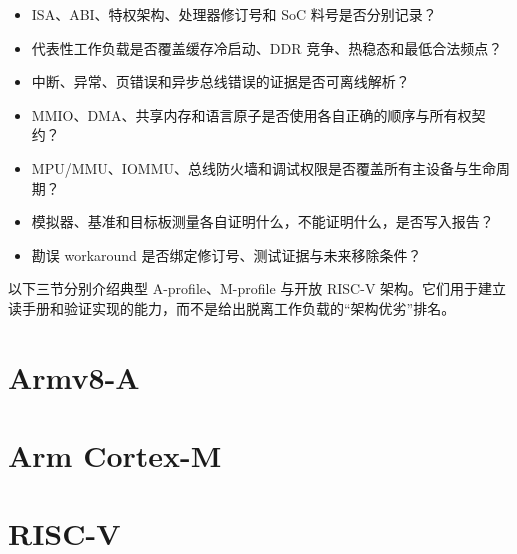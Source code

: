 \begin{itemize}
  \item ISA、ABI、特权架构、处理器修订号和 SoC 料号是否分别记录？
  \item 代表性工作负载是否覆盖缓存冷启动、DDR 竞争、热稳态和最低合法频点？
  \item 中断、异常、页错误和异步总线错误的证据是否可离线解析？
  \item MMIO、DMA、共享内存和语言原子是否使用各自正确的顺序与所有权契约？
  \item MPU/MMU、IOMMU、总线防火墙和调试权限是否覆盖所有主设备与生命周期？
  \item 模拟器、基准和目标板测量各自证明什么，不能证明什么，是否写入报告？
  \item 勘误 workaround 是否绑定修订号、测试证据与未来移除条件？
\end{itemize}

以下三节分别介绍典型 A-profile、M-profile 与开放 RISC-V 架构。它们用于建立读手册和验证实现的能力，而不是给出脱离工作负载的“架构优劣”排名。

\section{Armv8-A}


\section{Arm Cortex-M}


\clearpage
\section{RISC-V}


